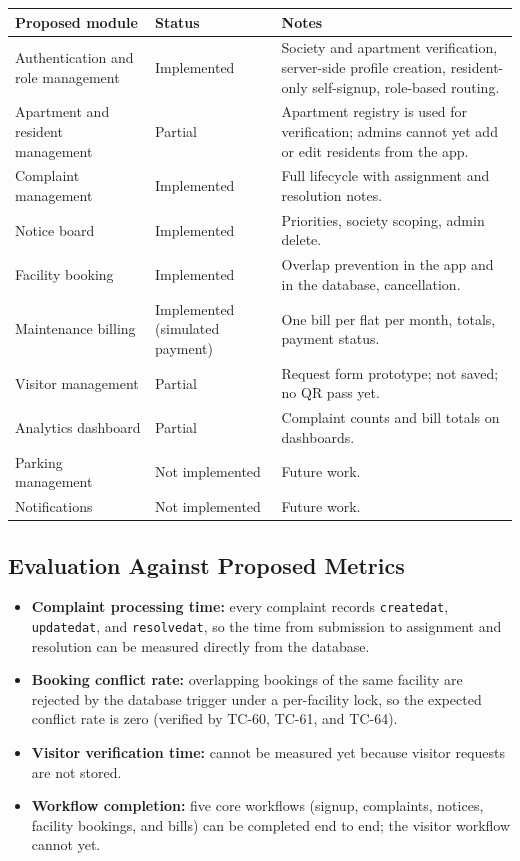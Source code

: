 \documentclass{tietreport}
\renewcommand{\_}{\textunderscore\allowbreak}
\begin{document}
\begin{longtable}{L{4.2cm} L{2.6cm} L{6.8cm}}
\toprule
\textbf{Proposed module} & \textbf{Status} & \textbf{Notes} \\
\midrule
\endhead
Authentication and role management & Implemented & Society and apartment
verification, server-side profile creation, resident-only self-signup,
role-based routing. \\
Apartment and resident management & Partial & Apartment registry is used
for verification; admins cannot yet add or edit residents from the app. \\
Complaint management & Implemented & Full lifecycle with assignment and
resolution notes. \\
Notice board & Implemented & Priorities, society scoping, admin delete. \\
Facility booking & Implemented & Overlap prevention in the app and in the
database, cancellation. \\
Maintenance billing & Implemented (simulated payment) & One bill per flat
per month, totals, payment status. \\
Visitor management & Partial & Request form prototype; not saved; no QR
pass yet. \\
Analytics dashboard & Partial & Complaint counts and bill totals on
dashboards. \\
Parking management & Not implemented & Future work. \\
Notifications & Not implemented & Future work. \\
\bottomrule
\end{longtable}

\subsection{Evaluation Against Proposed Metrics}

\begin{itemize}
  \item \textbf{Complaint processing time:} every complaint records
  \texttt{created\_at}, \texttt{updated\_at}, and \texttt{resolved\_at}, so
  the time from submission to assignment and resolution can be measured
  directly from the database.
  \item \textbf{Booking conflict rate:} overlapping bookings of the same
  facility are rejected by the database trigger under a per-facility lock,
  so the expected conflict rate is zero (verified by TC-60, TC-61, and
  TC-64).
  \item \textbf{Visitor verification time:} cannot be measured yet because
  visitor requests are not stored.
  \item \textbf{Workflow completion:} five core workflows (signup,
  complaints, notices, facility bookings, and bills) can be completed end to
  end; the visitor workflow cannot yet.
\end{itemize}
\end{document}
